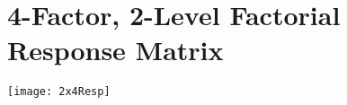 \chapter{4-Factor, 2-Level Factorial Response Matrix}
\begin{center}
\texttt{[image: 2x4Resp]}
\end{center}